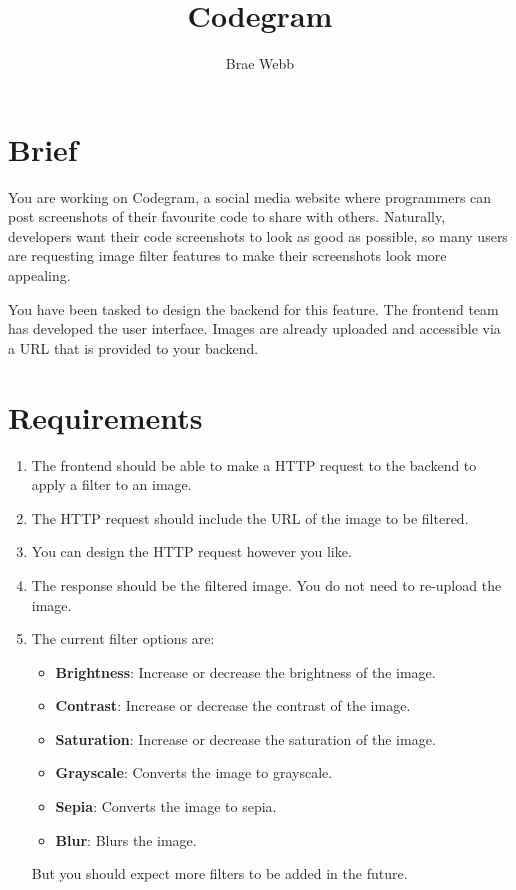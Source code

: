 \documentclass{csse4400}
\title{Codegram}
\author{Brae Webb}
\date{\week{2}}
\begin{document}
\maketitle


\section{Brief}

You are working on Codegram,
a social media website where programmers can post screenshots of their favourite code to share with others.
Naturally, developers want their code screenshots to look as good as possible,
so many users are requesting image filter features to make their screenshots look more appealing.

You have been tasked to design the backend for this feature.
The frontend team has developed the user interface.
Images are already uploaded and accessible via a URL that is provided to your backend.


\section{Requirements}

\begin{enumerate}
    \item The frontend should be able to make a HTTP request to the backend to apply a filter to an image.
    \item The HTTP request should include the URL of the image to be filtered.
    \item You can design the HTTP request however you like.
    \item The response should be the filtered image. You do not need to re-upload the image.
    \item The current filter options are:
          \begin{itemize}
              \item \textbf{Brightness}: Increase or decrease the brightness of the image.
              \item \textbf{Contrast}: Increase or decrease the contrast of the image.
              \item \textbf{Saturation}: Increase or decrease the saturation of the image.
              \item \textbf{Grayscale}: Converts the image to grayscale.
              \item \textbf{Sepia}: Converts the image to sepia.
              \item \textbf{Blur}: Blurs the image.
          \end{itemize}
          But you should expect more filters to be added in the future.
\end{enumerate}
\end{document}
